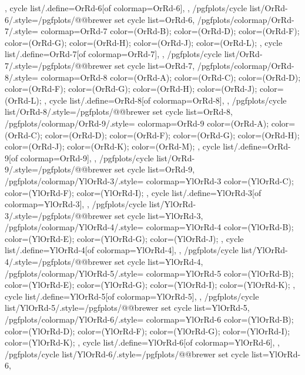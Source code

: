 {{{    },
    cycle list/.define={OrRd-6}{[of colormap=OrRd-6]},
  },
  /pgfplots/cycle list/OrRd-6/.style={/pgfplots/@@brewer set cycle list={OrRd-6}},
  /pgfplots/colormap/OrRd-7/.style={
    colormap={OrRd-7}{
      color=(OrRd-B);
      color=(OrRd-D);
      color=(OrRd-F);
      color=(OrRd-G);
      color=(OrRd-H);
      color=(OrRd-J);
      color=(OrRd-L);
    },
    cycle list/.define={OrRd-7}{[of colormap=OrRd-7]},
  },
  /pgfplots/cycle list/OrRd-7/.style={/pgfplots/@@brewer set cycle list={OrRd-7}},
  /pgfplots/colormap/OrRd-8/.style={
    colormap={OrRd-8}{
      color=(OrRd-A);
      color=(OrRd-C);
      color=(OrRd-D);
      color=(OrRd-F);
      color=(OrRd-G);
      color=(OrRd-H);
      color=(OrRd-J);
      color=(OrRd-L);
    },
    cycle list/.define={OrRd-8}{[of colormap=OrRd-8]},
  },
  /pgfplots/cycle list/OrRd-8/.style={/pgfplots/@@brewer set cycle list={OrRd-8}},
  /pgfplots/colormap/OrRd-9/.style={
    colormap={OrRd-9}{
      color=(OrRd-A);
      color=(OrRd-C);
      color=(OrRd-D);
      color=(OrRd-F);
      color=(OrRd-G);
      color=(OrRd-H);
      color=(OrRd-J);
      color=(OrRd-K);
      color=(OrRd-M);
    },
    cycle list/.define={OrRd-9}{[of colormap=OrRd-9]},
  },
  /pgfplots/cycle list/OrRd-9/.style={/pgfplots/@@brewer set cycle list={OrRd-9}},
  /pgfplots/colormap/YlOrRd-3/.style={
    colormap={YlOrRd-3}{
      color=(YlOrRd-C);
      color=(YlOrRd-F);
      color=(YlOrRd-I);
    },
    cycle list/.define={YlOrRd-3}{[of colormap=YlOrRd-3]},
  },
  /pgfplots/cycle list/YlOrRd-3/.style={/pgfplots/@@brewer set cycle list={YlOrRd-3}},
  /pgfplots/colormap/YlOrRd-4/.style={
    colormap={YlOrRd-4}{
      color=(YlOrRd-B);
      color=(YlOrRd-E);
      color=(YlOrRd-G);
      color=(YlOrRd-J);
    },
    cycle list/.define={YlOrRd-4}{[of colormap=YlOrRd-4]},
  },
  /pgfplots/cycle list/YlOrRd-4/.style={/pgfplots/@@brewer set cycle list={YlOrRd-4}},
  /pgfplots/colormap/YlOrRd-5/.style={
    colormap={YlOrRd-5}{
      color=(YlOrRd-B);
      color=(YlOrRd-E);
      color=(YlOrRd-G);
      color=(YlOrRd-I);
      color=(YlOrRd-K);
    },
    cycle list/.define={YlOrRd-5}{[of colormap=YlOrRd-5]},
  },
  /pgfplots/cycle list/YlOrRd-5/.style={/pgfplots/@@brewer set cycle list={YlOrRd-5}},
  /pgfplots/colormap/YlOrRd-6/.style={
    colormap={YlOrRd-6}{
      color=(YlOrRd-B);
      color=(YlOrRd-D);
      color=(YlOrRd-F);
      color=(YlOrRd-G);
      color=(YlOrRd-I);
      color=(YlOrRd-K);
    },
    cycle list/.define={YlOrRd-6}{[of colormap=YlOrRd-6]},
  },
  /pgfplots/cycle list/YlOrRd-6/.style={/pgfplots/@@brewer set cycle list={YlOrRd-6}},
}
